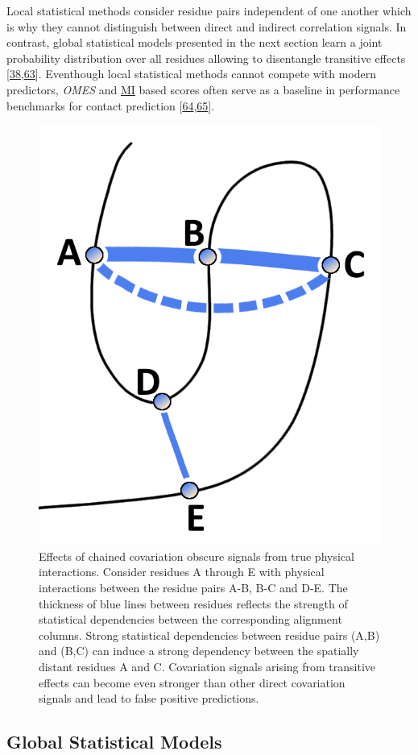 \documentclass[11pt,a4paper,twoside]{book}
\theoremstyle{definition}
\theoremstyle{definition}
\theoremstyle{remark}
\begin{document}
Local statistical methods consider residue pairs independent of one
another which is why they cannot distinguish between direct and indirect
correlation signals. In contrast, global statistical models presented in
the next section learn a joint probability distribution over all
residues allowing to disentangle transitive effects
{[}\protect\hyperlink{ref-Weigt2009}{38},\protect\hyperlink{ref-Burger2010}{63}{]}.
Eventhough local statistical methods cannot compete with modern
predictors, \emph{OMES} and \protect\hyperlink{abbrev}{MI} based scores
often serve as a baseline in performance benchmarks for contact
prediction
{[}\protect\hyperlink{ref-DeJuan2013}{64},\protect\hyperlink{ref-Jones2012}{65}{]}.












\begin{figure}

{\centering \includegraphics[width=0.25\linewidth]{img/intro/transitive_effects} 

}

\caption{Effects of chained covariation obscure
signals from true physical interactions. Consider residues A through E
with physical interactions between the residue pairs A-B, B-C and D-E.
The thickness of blue lines between residues reflects the strength of
statistical dependencies between the corresponding alignment columns.
Strong statistical dependencies between residue pairs (A,B) and (B,C)
can induce a strong dependency between the spatially distant residues A
and C. Covariation signals arising from transitive effects can become
even stronger than other direct covariation signals and lead to false
positive predictions.}\label{fig:transitive-effect}
\end{figure}

\subsection{Global Statistical Models}\label{global-methods}
\end{document}
